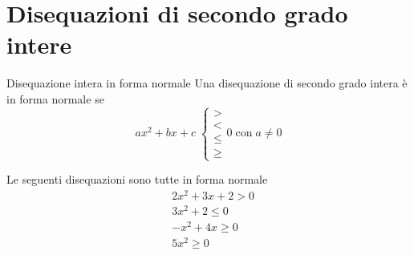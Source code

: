 \section{Disequazioni di secondo grado intere}
\begin{definizionet}{Disequazione intera in forma normale}{}
Una disequazione di secondo grado intera è in forma normale se \[ax^2+bx+c\;\begin{cases}
>\\
<\\
\leq\\
\geq
\end{cases} 0\; \text{con}\; a\neq 0\]
\end{definizionet}
\begin{osservazionet}{}{}
Le seguenti disequazioni sono tutte in forma normale
\begin{align*}
&2x^2+3x+2>0\\
&3x^2+2\leq0\\
&-x^2+4x\geq0\\
&5x^2\geq0
\end{align*}
\end{osservazionet} 
